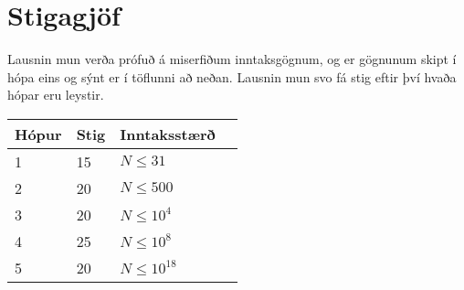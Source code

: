 \section*{Stigagjöf}
Lausnin mun verða prófuð á miserfiðum inntaksgögnum, og er gögnunum skipt í
hópa eins og sýnt er í töflunni að neðan. Lausnin mun svo fá stig eftir því
hvaða hópar eru leystir.

\begin{tabular}{|l|l|l|l|}
\hline
Hópur & Stig & Inntaksstærð \\ \hline
1     & 15   & $N \le 31$ \\ \hline
2     & 20   & $N \le 500$ \\ \hline
3     & 20   & $N \le 10^4$ \\ \hline
4     & 25   & $N \le 10^8$ \\ \hline
5     & 20   & $N \le 10^{18}$ \\ \hline
\end{tabular}
